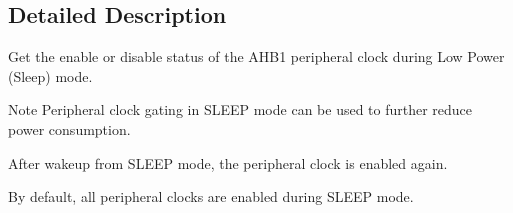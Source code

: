 \subsection{Detailed Description}
Get the enable or disable status of the A\+H\+B1 peripheral clock during Low Power (Sleep) mode. 

\begin{DoxyNote}{Note}
Peripheral clock gating in S\+L\+E\+EP mode can be used to further reduce power consumption. 

After wakeup from S\+L\+E\+EP mode, the peripheral clock is enabled again. 

By default, all peripheral clocks are enabled during S\+L\+E\+EP mode. 
\end{DoxyNote}
